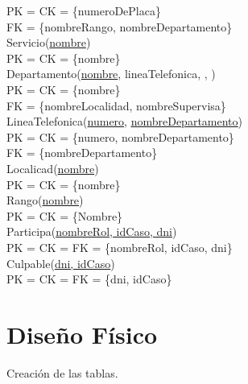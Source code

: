 \documentclass[10pt,a4paper]{article}
\begin{document}
	PK = CK = \{numeroDePlaca\}\\ 
	FK = \{nombreRango, nombreDepartamento\}\\
\newline
Servicio(\underline{nombre})\\ 
	PK = CK = \{nombre\}\\ 
\newline
Departamento(\underline{nombre}, lineaTelefonica, , )\\ 
	PK = CK = \{nombre\}\\ 
	FK = \{nombreLocalidad, nombreSupervisa\}\\
\newline
LineaTelefonica(\underline{numero}, \underline{\underline{nombreDepartamento}})\\ 
	PK = CK = \{numero, nombreDepartamento\}\\ 
	FK = \{nombreDepartamento\}\\
\newline
Localicad(\underline{nombre})\\ 
	PK = CK = \{nombre\}\\ 
\newline
Rango(\underline{nombre})\\ 
	PK = CK = \{Nombre\}\\ 
\newline
Participa(\underline{\underline{nombreRol, idCaso, dni}})\\ 
	PK = CK = FK = \{nombreRol, idCaso, dni\}\\ 
\newline
Culpable(\underline{\underline{dni, idCaso}})\\ 
	PK = CK = FK = \{dni, idCaso\}\\ 

\section{Diseño Físico}
Creación de las tablas.
\end{document}
